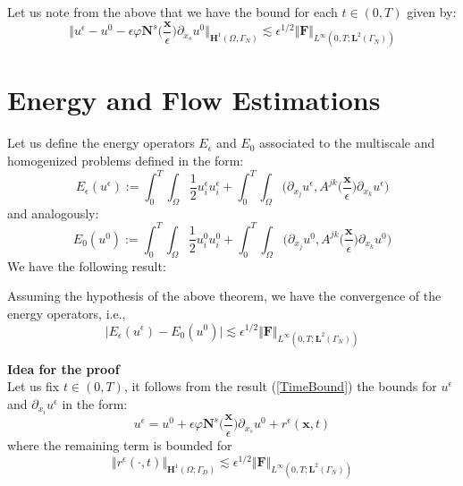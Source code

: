 \begin{rem}
Let us note from the above that we have the bound for each $t \in (0,T)$ given by:
\begin{equation}
    \label{TimeBound}
    \Vert u^{\epsilon} - u^0 - \epsilon \varphi \mathbf{N}^s\big( \frac{\mathbf{x}}{\epsilon} \big) \partial_{x_s} u^0 \Vert_{\mathbf{H}^1(\Omega, \Gamma_N)} \lesssim \epsilon^{1/2} \Vert \mathbf{F}\Vert_{L^{\infty}(0,T;\mathbf{L}^{2}(\Gamma_N))}
\end{equation}
\end{rem}
\section{Energy and Flow Estimations}
Let us define the energy operators $E_{\epsilon}$ and $E_{0}$ associated to the multiscale and homogenized problems defined in the form:
\begin{equation*}
    E_{\epsilon}(u^{\epsilon}) := \int_0^T \int_{\Omega} \frac{1}{2}u_i^{\epsilon}u_i^{\epsilon} + \int_0^T \int_{\Omega} \big( \partial_{x_j} u^{\epsilon}, A^{jk} \big( \frac{\mathbf{x}}{\epsilon}\big) \partial_{x_k} u^{\epsilon} \big)
\end{equation*}
and analogously:
\begin{equation*}
    E_0(u^0) := \int_0^T \int_{\Omega} \frac{1}{2}u_i^{0}u_i^{0} + \int_0^T \int_{\Omega} \big( \partial_{x_j} u^0, A^{jk} \big( \frac{\mathbf{x}}{\epsilon}\big) \partial_{x_k} u^0 \big)
\end{equation*}
We have the following result:
\begin{lem}
Assuming the hypothesis of the above theorem, we have the convergence of the energy operators, i.e., 
\begin{equation*}
    \vert E_{\epsilon} (u^{\epsilon}) - E_0 (u^0) \vert \lesssim \epsilon^{1/2} \Vert \mathbf{F} \Vert_{L^{\infty}(0,T; \mathbf{L}^{2}(\Gamma_N))} 
\end{equation*}
\end{lem}
\textbf{Idea for the proof} \\
Let us fix $t \in (0,T)$, it follows from the result (\ref{TimeBound}) the bounds for $u^{\epsilon}$ and $\partial_{x_i} u^{\epsilon}$ in the form:
\begin{equation*}
    u^{\epsilon} = u^0 + \epsilon \varphi \mathbf{N}^s\big( \frac{\mathbf{x}}{\epsilon} \big) \partial_{x_s} u^0 + r^{\epsilon}(\mathbf{x},t) 
\end{equation*}
where the remaining term is bounded for
\begin{equation*}
    \Vert r^{\epsilon}(\cdot, t) \Vert_{\mathbf{H}^1(\Omega; \Gamma_D)} \lesssim \epsilon^{1/2} \Vert \mathbf{F}\Vert_{L^{\infty}(0,T;\mathbf{L}^{2}(\Gamma_N))}
\end{equation*}
